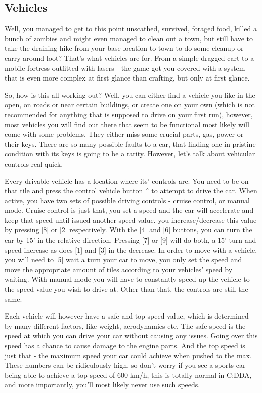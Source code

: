 \documentclass[11pt]{report}
\begin{document}
\subsection{Vehicles}

Well, you managed to get to this point unscathed, survived, foraged food, killed a bunch of zombies and might even managed to clean out a town, but still have to take the draining hike from your base location to town to do some cleanup or carry around loot? That's what vehicles are for. From a simple dragged cart to a mobile fortress outfitted with lasers - the game got you covered with a system that is even more complex at first glance than crafting, but only at first glance.

So, how is this all working out? Well, you can either find a vehicle you like in the open, on roads or near certain buildings, or create one on your own (which is not recommended for anything that is supposed to drive on your first run), however, most vehicles you will find out there that seem to be functional most likely will come with some problems. They either miss some crucial parts, gas, power or their keys. There are so many possible faults to a car, that finding one in pristine condition with its keys is going to be a rarity. However, let's talk about vehicular controls real quick.

Every drivable vehicle has a location where its' controls are. You need to be on that tile and press the control vehicle button [\^] to attempt to drive the car. When active, you have two sets of possible driving controls - cruise control, or manual mode. Cruise control is just that, you set a speed and the car will accelerate and keep that speed until issued another speed value. you increase/decrease this value by pressing [8] or [2] respectively. With the [4] and [6] buttons, you can turn the car by 15' in the relative direction. Pressing [7] or [9] will do both, a 15' turn and speed increase as does [1] and [3] in the decrease. In order to move with a vehicle, you will need to [5] wait a turn your car to move, you only set the speed and move the appropriate amount of tiles according to your vehicles' speed by waiting. With manual mode you will have to constantly speed up the vehicle to the speed value you wish to drive at. Other than that, the controls are still the same.

Each vehicle will however have a safe and top speed value, which is determined by many different factors, like weight, aerodynamics etc. The safe speed is the speed at which you can drive your car without causing any issues. Going over this speed has a chance to cause damage to the engine parts. And the top speed is just that - the maximum speed your car could achieve when pushed to the max. These numbers can be ridiculously high, so don't worry if you see a sports car being able to achieve a top speed of 600 km/h, this is totally normal in C:DDA, and more importantly, you'll most likely never use such speeds.
\end{document}
